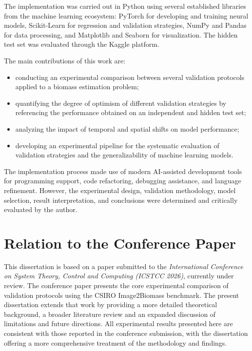 The implementation was carried out in Python using several established libraries from the machine learning ecosystem: PyTorch for developing and training neural models, Scikit-Learn for regression and validation strategies, NumPy and Pandas for data processing, and Matplotlib and Seaborn for visualization. The hidden test set was evaluated through the Kaggle platform.

The main contributions of this work are:

\begin{itemize}
    \item conducting an experimental comparison between several validation protocols applied to a biomass estimation problem;
    \item quantifying the degree of optimism of different validation strategies by referencing the performance obtained on an independent and hidden test set;
    \item analyzing the impact of temporal and spatial shifts on model performance;
    \item developing an experimental pipeline for the systematic evaluation of validation strategies and the generalizability of machine learning models.
\end{itemize}

The implementation process made use of modern AI-assisted development tools for programming support, code refactoring, debugging assistance, and language refinement. However, the experimental design, validation methodology, model selection, result interpretation, and conclusions were determined and critically evaluated by the author.

\section{Relation to the Conference Paper}

This dissertation is based on a paper submitted to the \textit{International Conference on System Theory, Control and Computing (ICSTCC 2026)}, currently under review. The conference paper presents the core experimental comparison of validation protocols using the CSIRO Image2Biomass benchmark. The present dissertation extends that work by providing a more detailed theoretical background, a broader literature review and an expanded discussion of limitations and future directions. All experimental results presented here are consistent with those reported in the conference submission, with the dissertation offering a more comprehensive treatment of the methodology and findings.

